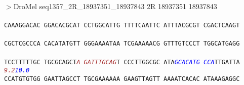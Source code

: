 \documentclass[11pt,twoside,reqno,a4paper]{article}
\begin{document}
\noindent
\newlength{\charwidth}$>$DroMel	seq1357\_2R\_18937351\_18937843	2R	18937351	18937843 \\
 \\
\texttt{CAAAGGACAC	GGACACGCAT	CCTGGCATTG	TTTTCAATTC	ATTTACGCGT	CGACTCAAGT	\\
\hspace*{1\charwidth}\hspace*{1\charwidth}\hspace*{1\charwidth}\hspace*{1\charwidth}\hspace*{1\charwidth}\hspace*{1\charwidth}\\
CGCTCGCCCA	CACATATGTT	GGGAAAATAA	TCGAAAAACG	GTTTGTCCCT	TGGCATGAGG	\\
\hspace*{1\charwidth}\hspace*{1\charwidth}\hspace*{1\charwidth}\hspace*{1\charwidth}\hspace*{1\charwidth}\hspace*{1\charwidth}\\
TCCTTTTTGC	TGCGCAGCT\textit{\textcolor{Brown}{A}}	\textit{\textcolor{Brown}{G}}\textit{\textcolor{Brown}{A}}\textit{\textcolor{Brown}{T}}\textit{\textcolor{Brown}{T}}\textit{\textcolor{Brown}{T}}\textit{\textcolor{Brown}{G}}\textit{\textcolor{Brown}{C}}\textit{\textcolor{Brown}{A}}\textit{\textcolor{Brown}{G}}T	CCCTTGGCGC	ATA\textit{\textcolor{Blue}{G}}\textit{\textcolor{Blue}{C}}\textit{\textcolor{Blue}{A}}\textit{\textcolor{Blue}{C}}\textit{\textcolor{Blue}{A}}\textit{\textcolor{Blue}{T}}\textit{\textcolor{Blue}{G}}	\textit{\textcolor{Blue}{C}}\textit{\textcolor{Blue}{C}}\textit{\textcolor{Blue}{A}}TTGATTA	\\
\hspace*{1\charwidth}\hspace*{19\charwidth}\textit{\textcolor{Brown}{9.2}}\hspace*{1\charwidth}\hspace*{1\charwidth}\hspace*{-57\charwidth}\textit{\textcolor{Blue}{10.0}}\hspace*{1\charwidth}\hspace*{1\charwidth}\\
CCATGTGTGG	GAATTAGCCT	TGCGAAAAAA	GAAGTTAGTT	AAAATCACAC	ATAAAGAGGC	\\
\hspace*{1\charwidth}\hspace*{1\charwidth}\hspace*{1\charwidth}\hspace*{1\charwidth}\hspace*{1\charwidth}\hspace*{1\charwidth}\\
}
\end{document}
